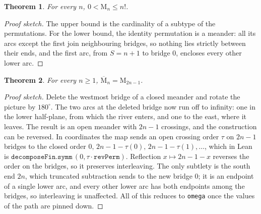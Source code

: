 \documentclass[11pt]{amsart}
\newtheorem{theorem}{Theorem}[section]
\theoremstyle{definition}
\theoremstyle{remark}
\newcommand{\Open}{\mathrm{M}}
\newcommand{\Closed}{\overline{\mathrm{M}}}
\newcommand{\code}[1]{\texttt{#1}}
\begin{document}
\begin{theorem}\label{thm:basic}
For every $n$, $0 < \Open_n \le n!$.
\end{theorem}
\begin{proof}[Proof sketch]
The upper bound is the cardinality of a subtype of the permutations. For the lower bound, the
identity permutation is a meander: all its arcs except the first join neighbouring bridges, so
nothing lies strictly between their ends, and the first arc, from $S=n+1$ to bridge $0$,
encloses every other lower arc.
\end{proof}

\begin{theorem}\label{thm:closed-open}
For every $n \ge 1$, $\Closed_n = \Open_{2n-1}$.
\end{theorem}
\begin{proof}[Proof sketch]
Delete the westmost bridge of a closed meander and rotate the picture by $180^\circ$. The two
arcs at the deleted bridge now run off to infinity: one in the lower half-plane, from which the
river enters, and one to the east, where it leaves. The result is an open meander with $2n-1$
crossings, and the construction can be reversed. In coordinates the map sends an open crossing
order $\tau$ on $2n-1$ bridges to the closed order $0,\,2n-1-\tau(0),\,2n-1-\tau(1),\dots$,
which in Lean is $\code{decomposeFin.symm}\,(0, \tau \cdot \code{revPerm})$. Reflection
$x \mapsto 2n-1-x$ reverses the order on the bridges, so it preserves interleaving. The only
subtlety is the south end $2n$, which truncated subtraction sends to the new bridge $0$; it is
an endpoint of a single lower arc, and every other lower arc has both endpoints among the
bridges, so interleaving is unaffected. All of this reduces to \code{omega} once the values of
the path are pinned down.
\end{proof}
\end{document}
